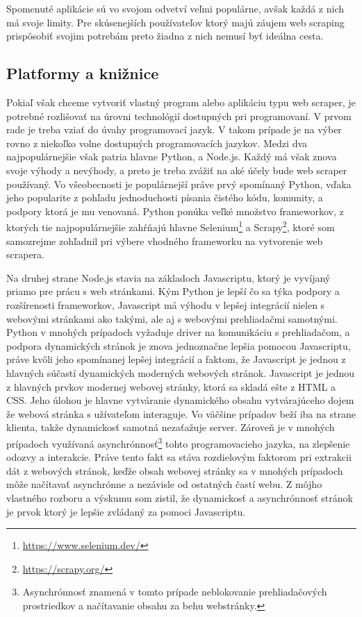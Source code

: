 Spomenuté aplikácie sú vo svojom odvetví veľmi populárne, avšak každá z nich má svoje limity. Pre skúsenejších používateľov ktorý majú záujem web scraping prispôsobiť svojim potrebám preto žiadna z nich nemusí byť ideálna cesta.

\subsection{Platformy a knižnice}

Pokiaľ však chceme vytvoriť vlastný program alebo aplikáciu typu web scraper, je potrebné rozlišovať na úrovni technológií dostupných pri programovaní. V prvom rade je treba vziať do úvahy programovací jazyk. V takom prípade je na výber rovno z niekoľko volne dostupných programovacích jazykov. Medzi dva najpopulárnejšie však patria hlavne Python, a Node.js. Každý má však znova svoje výhody a nevýhody, a preto je treba zvážiť na aké účely bude web scraper používaný. Vo všeobecnosti je populárnejší práve prvý spomínaný Python, vďaka jeho popularite z pohľadu jednoduchosti písania čistého kódu, komunity, a podpory ktorá je mu venovaná. Python ponúka veľké množstvo frameworkov, z ktorých tie najpopulárnejšie zahŕňajú hlavne Selenium\footnote{\url{https://www.selenium.dev/}} a Scrapy\footnote{\url{https://scrapy.org/}}, ktoré som samozrejme zohľadnil pri výbere vhodného frameworku na vytvorenie web scrapera.

Na druhej strane Node.js stavia na základoch Javascriptu, ktorý je vyvíjaný priamo pre prácu s web stránkami. Kým Python je lepší čo sa týka podpory a rozšírenosti frameworkov, Javascript má výhodu v lepšej integrácií nielen s webovými stránkami ako takými, ale aj s webovými prehliadačmi samotnými. Python v mnohých prípadoch vyžaduje driver na komunikáciu s prehliadačom, a podpora dynamických stránok je znova jednoznačne lepšia pomocou Javascriptu, práve kvôli jeho spomínanej lepšej integrácií a faktom, že Javascript je jednou z hlavných súčastí dynamických moderných webových stránok. Javascript je jednou z hlavných prvkov modernej webovej stránky, ktorá sa skladá ešte z HTML a CSS. Jeho úlohou je hlavne vytváranie dynamického obsahu vytvárajúceho dojem že webová stránka s užívateľom interaguje. Vo väčšine prípadov beží iba na strane klienta, takže dynamickosť samotná nezaťažuje server. Zároveň je v mnohých prípadoch využívaná asynchrónnosť\footnote{Asynchrónnosť znamená v tomto prípade neblokovanie prehliadačových prostriedkov a načítavanie obsahu za behu webstránky.} tohto programovacieho jazyka, na zlepšenie odozvy a interakcie. Práve tento fakt sa stáva rozdielovým faktorom pri extrakcii dát z webových stránok, keďže obsah webovej stránky sa v mnohých prípadoch môže načítavať asynchrónne a nezávisle od ostatných častí webu. Z môjho vlastného rozboru a výskumu som zistil, že dynamickosť a asynchrónnosť stránok je prvok ktorý je lepšie zvládaný za pomoci Javascriptu. \cite{The5Best}\cite{Javascript}

